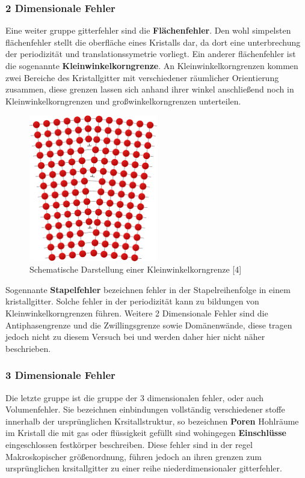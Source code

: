         \subsubsection*{2 Dimensionale Fehler}
            Eine weiter gruppe gitterfehler sind die \textbf{Flächenfehler}. Den wohl simpelsten flächenfehler
            stellt die oberfläche eines Kristalls dar, da dort eine unterbrechung der periodizität und translationssymetrie vorliegt.
            Ein anderer flächenfehler ist die sogenannte \textbf{Kleinwinkelkorngrenze}. An Kleinwinkelkorngrenzen kommen zwei 
            Bereiche des Kristallgitter mit verschiedener räumlicher Orientierung zusammen, diese grenzen lassen sich anhand ihrer winkel
            anschließend noch in Kleinwinkelkorngrenzen und großwinkelkorngrenzen unterteilen.
            \begin{figure}[H]
                \centering
                \includegraphics[width=0.5\textwidth]{Images/Kleinwinkelkorngrenze.png}
                \caption{Schematische Darstellung einer Kleinwinkelkorngrenze [4]}
            \end{figure}
            Sogennante \textbf{Stapelfehler} bezeichnen fehler in der Stapelreihenfolge in einem kristallgitter. Solche fehler in der periodizität
            kann zu bildungen von Kleinwinkelkorngrenzen führen.
            Weitere 2 Dimensionale Fehler sind die Antiphasengrenze und die Zwillingsgrenze sowie Domänenwände, diese tragen jedoch nicht
            zu diesem Versuch bei und werden daher hier nicht näher beschrieben.
        \subsubsection*{3 Dimensionale Fehler}
            Die letzte gruppe ist die gruppe der 3 dimensionalen fehler, oder auch Volumenfehler. Sie bezeichnen einbindungen vollständig verschiedener stoffe innerhalb der ursprünglichen
            Krsitallstruktur, so bezeichnen \textbf{Poren} Hohlräume im Kristall die mit gas oder flüssigkeit gefüllt sind wohingegen
            \textbf{Einschlüsse} eingeschlossen festkörper beschreiben.
            Diese fehler sind in der regel Makroskopischer größenordnung, führen jedoch an ihren grenzen zum ursprünglichen krsitallgitter
            zu einer reihe niederdimensionaler gitterfehler.


